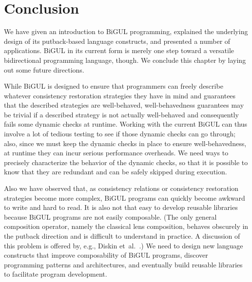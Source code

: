 
\section{Conclusion}

We have given an introduction to BiGUL programming, explained the underlying design of its putback-based language constructs, and presented a number of applications.
BiGUL in its current form is merely one step toward a versatile bidirectional programming language, though.
We conclude this chapter by laying out some future directions.

While BiGUL is designed to ensure that programmers can freely describe whatever consistency restoration strategies they have in mind and guarantees that the described strategies are well-behaved,
well-behavedness guarantees may be trivial if a described strategy is not actually well-behaved and consequently fails some dynamic checks at runtime.
Working with the current BiGUL can thus involve a lot of tedious testing to see if those dynamic checks can go through; also, since we must keep the dynamic checks in place to ensure well-behavedness, at runtime they can incur serious performance overheads.
We need ways to precisely characterize the behavior of the dynamic checks, so that it is possible to know that they are redundant and can be safely skipped during execution.

Also we have observed that, as consistency relations or consistency restoration strategies become more complex, BiGUL programs can quickly become awkward to write and hard to read.
It is also not that easy to develop reusable libraries because BiGUL programs are not easily composable.
(The only general composition operator, namely the classical lens composition, behaves obscurely in the putback direction and is difficult to understand in practice.
A discussion of this problem is offered by, e.g., Diskin et~al.~\cite[Section~2.2]{Diskin-delta-asymmetric}.)
We need to design new language constructs that improve composability of BiGUL programs, discover programming patterns and architectures, and eventually build reusable libraries to facilitate program development.

